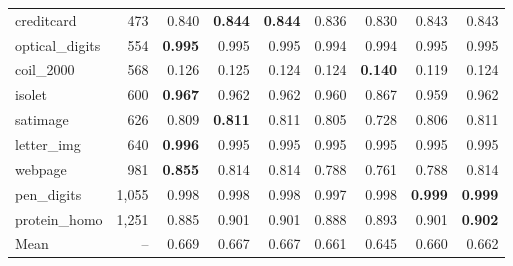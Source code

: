 \begin{tabular}{lrrrrrrrr}
creditcard & 473 & 0.840 & \textbf{0.844} & \textbf{0.844} & 0.836 & 0.830 & 0.843 & 0.843 \\
optical\_digits & 554 & \textbf{0.995} & 0.995 & 0.995 & 0.994 & 0.994 & 0.995 & 0.995 \\
coil\_2000 & 568 & 0.126 & 0.125 & 0.124 & 0.124 & \textbf{0.140} & 0.119 & 0.124 \\
isolet & 600 & \textbf{0.967} & 0.962 & 0.962 & 0.960 & 0.867 & 0.959 & 0.962 \\
satimage & 626 & 0.809 & \textbf{0.811} & 0.811 & 0.805 & 0.728 & 0.806 & 0.811 \\
letter\_img & 640 & \textbf{0.996} & 0.995 & 0.995 & 0.995 & 0.995 & 0.995 & 0.995 \\
webpage & 981 & \textbf{0.855} & 0.814 & 0.814 & 0.788 & 0.761 & 0.788 & 0.814 \\
pen\_digits & 1,055 & 0.998 & 0.998 & 0.998 & 0.997 & 0.998 & \textbf{0.999} & \textbf{0.999} \\
protein\_homo & 1,251 & 0.885 & 0.901 & 0.901 & 0.888 & 0.893 & 0.901 & \textbf{0.902} \\
\midrule
Mean & -- & 0.669 & 0.667 & 0.667 & 0.661 & 0.645 & 0.660 & 0.662 \\
\bottomrule
\end{tabular}
